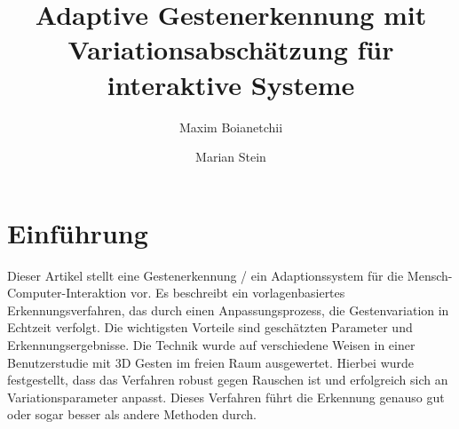 \documentclass{llncs}
\begin{document}
\pagestyle{headings}

\mainmatter

\title{Adaptive Gestenerkennung mit Variationsabschätzung für interaktive Systeme}


\author{Maxim Boianetchii \and Marian Stein}



\maketitle
\section{Einführung}
Dieser Artikel stellt eine Gestenerkennung / ein Adaptionssystem für die Mensch-Computer-Interaktion vor. Es beschreibt ein vorlagenbasiertes Erkennungsverfahren, das durch einen Anpassungsprozess, die Gestenvariation in Echtzeit verfolgt. Die wichtigsten Vorteile sind geschätzten Parameter und Erkennungsergebnisse. Die Technik wurde auf verschiedene Weisen in einer Benutzerstudie mit 3D Gesten im freien Raum ausgewertet. Hierbei wurde festgestellt, dass das Verfahren robust gegen Rauschen ist und erfolgreich sich an Variationsparameter anpasst. Dieses Verfahren führt die Erkennung genauso gut oder sogar besser als andere Methoden durch.
\end{document}
